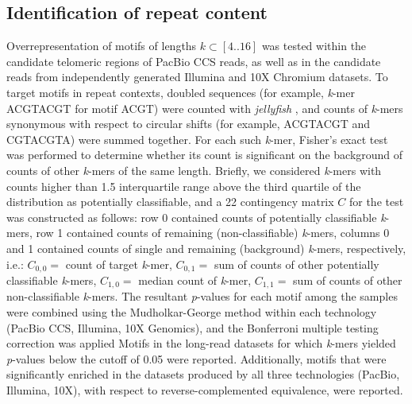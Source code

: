 \documentclass{article}
\begin{document}
\subsection*{Identification of repeat content}
Overrepresentation of motifs of lengths $k \subset [4 .. 16]$ was tested within the candidate telomeric regions of PacBio CCS reads, as well as in the candidate reads from independently generated Illumina and 10X Chromium datasets.  %
To target motifs in repeat contexts, doubled sequences (for example, \textit{k}-mer ACGTACGT for motif ACGT) were counted with \textit{jellyfish} \cite{jellyfish}, and counts of \textit{k}-mers synonymous with respect to circular shifts (for example, ACGTACGT and CGTACGTA) were summed together.
For each such \textit{k}-mer, Fisher's exact test was performed to determine whether its count is significant on the background of counts of other \textit{k}-mers of the same length.
Briefly, we considered \textit{k}-mers with counts higher than 1.5 interquartile range above the third quartile of the distribution as potentially classifiable, and a 2\texttimes{}2 contingency matrix $ C $ for the test was constructed as follows:
row 0 contained counts of potentially classifiable \textit{k}-mers,
row 1 contained counts of remaining (non-classifiable) \textit{k}-mers,
columns 0 and 1 contained counts of single and remaining (background) \textit{k}-mers, respectively,
i.e.:
$ C_{0,0} = $ {\rmfamily count of target \textit{k}-mer},
$ C_{0,1} = $ {\rmfamily sum of counts of other potentially classifiable \textit{k}-mers},
$ C_{1,0} = $ {\rmfamily median count of \textit{k}-mer},
$ C_{1,1} = $ {\rmfamily sum of counts of other non-classifiable \textit{k}-mers}.
The resultant \textit{p}-values for each motif among the samples were combined using the Mudholkar-George method \cite{george} within each technology (PacBio CCS, Illumina, 10X Genomics), and the Bonferroni multiple testing correction was applied
Motifs in the long-read datasets for which \textit{k}-mers yielded \textit{p}-values below the cutoff of 0.05 were reported. %
Additionally, motifs that were significantly enriched in the datasets produced by all three technologies (PacBio, Illumina, 10X), with respect to reverse-complemented equivalence, were reported. %
\end{document}
